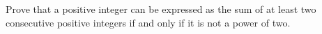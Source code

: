 Prove that a positive integer can be expressed as the sum of at least two consecutive positive integers if and only if it is not a power of two.
